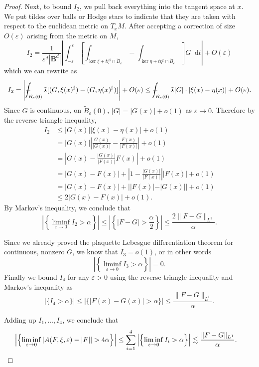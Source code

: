\documentclass[reqno,11pt]{amsart}
\newcommand{\Ball}{\mathbf{B}}
\newcommand*\dif{\mathop{}\!\mathrm{d}}
\theoremstyle{definition}
\numberwithin{equation}{section}
\def\Xint#1{\mathchoice
{\XXint\displaystyle\textstyle{#1}}%
{\XXint\textstyle\scriptstyle{#1}}%
{\XXint\scriptstyle\scriptscriptstyle{#1}}%
{\XXint\scriptscriptstyle\scriptscriptstyle{#1}}%
\!\int}
\def\XXint#1#2#3{{\setbox0=\hbox{$#1{#2#3}{\int}$ }
\vcenter{\hbox{$#2#3$ }}\kern-.6\wd0}}
\def\dashint{\Xint-}
\begin{document}
\begin{proof}
Next, to bound $I_2$, we pull back everything into the tangent space at $x$.
We put tildes over balls or Hodge stars to indicate that they are taken with respect to the euclidean metric on $T_x M$.
After accepting a correction of size $O(\varepsilon)$ arising from the metric on $M$, 
$$I_2 = \frac{1}{\varepsilon^d |\Ball^d|} \left|\int_{-\varepsilon}^\varepsilon \left[\int_{\ker \xi + t\xi^\sharp \cap \tilde B_\varepsilon} - \int_{\ker \eta + t\eta^\sharp \cap \tilde B_\varepsilon}\right] G \dif t\right| + O(\varepsilon)$$
which we can rewrite as
$$I_2 = \left|\dashint_{\tilde B_\varepsilon(0)} \tilde \star [(G, \xi(x)^\sharp) - (G, \eta(x)^\sharp)]\right| + O(\varepsilon) \leq \dashint_{\tilde B_\varepsilon(0)} \tilde \star |G| \cdot |\xi(x) - \eta(x)| + O(\varepsilon).$$
Since $G$ is continuous, on $\tilde B_\varepsilon(0)$, $|G| = |G(x)| + o(1)$ as $\varepsilon \to 0$.
Therefore by the reverse triangle inequality,
\begin{align*}
I_2
&\leq |G(x)| |\xi(x) - \eta(x)| + o(1) \\
&= |G(x)| \left|\frac{G(x)}{|G(x)|} - \frac{F(x)}{|F(x)|}\right| + o(1) \\
&= \left|G(x) - \frac{|G(x)|}{|F(x)|} F(x)\right| + o(1) \\
&= |G(x) - F(x)| + \left|1 - \frac{|G(x)|}{|F(x)|}\right| |F(x)| + o(1)\\
&= |G(x) - F(x)| + ||F(x)| - |G(x)|| + o(1) \\
&\leq 2|G(x) - F(x)| + o(1).
\end{align*}
By Markov's inequality, we conclude that 
$$\left|\left\{\liminf_{\varepsilon \to 0} I_2 > \alpha\right\}\right| \leq \left|\left\{|F - G| > \frac{\alpha}{2}\right\}\right| \leq \frac{2\|F - G\|_{L^1}}{\alpha}.$$

Since we already proved the plaquette Lebesgue differentiation theorem for continuous, nonzero $G$, we know that $I_3 = o(1)$, or in other words 
$$\left|\left\{\liminf_{\varepsilon \to 0} I_3 > \alpha\right\}\right| = 0.$$
Finally we bound $I_4$ for any $\varepsilon > 0$ using the reverse triangle inequality and Markov's inequality as 
$$|\{I_4 > \alpha\}| \leq |\{|F(x) - G(x)| > \alpha\}| \leq \frac{\|F - G\|_{L^1}}{\alpha}.$$

Adding up $I_1, \dots, I_4$, we conclude that 
\begin{align*}
\left|\left\{\liminf_{\varepsilon \to 0} |A(F, \xi, \varepsilon) - |F|| > 4\alpha\right\}\right| \leq \sum_{i=1}^4 \left|\left\{\liminf_{\varepsilon \to 0} I_i > \alpha\right\}\right| &\lesssim \frac{\|F - G\|_{L^1}}{\alpha}. \qedhere 
\end{align*}
\end{proof}
\end{document}
